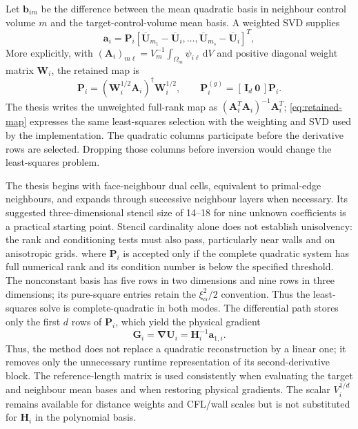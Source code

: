 \documentclass[11pt]{article}
\newcommand{\U}{\bm{U}}
\newcommand{\grad}{\bm{\nabla}}
\newcommand{\dd}{\mathrm{d}}
\begin{document}
Let $\bm b_{im}$ be the difference between the mean quadratic basis in neighbour control volume $m$ and the target-control-volume mean basis.  A weighted SVD supplies
\begin{equation}
 \bm a_i=\bm P_i
 \left[
  \overline{\U}_{m_1}-\overline{\U}_{i},\ldots,
  \overline{\U}_{m_s}-\overline{\U}_{i}
 \right]^{T},
\label{eq:quadratic-svd}
\end{equation}
More explicitly, with $(\bm A_i)_{m\ell}=V_m^{-1}\int_{\Omega_m}\psi_{i\ell}\,\dd V$ and positive diagonal weight matrix $\bm W_i$, the retained map is
\begin{equation}
 \bm P_i=(\bm W_i^{1/2}\bm A_i)^\dagger\bm W_i^{1/2},
 \qquad
 \bm P_i^{(g)}=[\,\bm I_d\ \bm 0\,]\bm P_i.
 \label{eq:retained-map}
\end{equation}
The thesis writes the unweighted full-rank map as $(\bm A_i^T\bm A_i)^{-1}\bm A_i^T$; \eqref{eq:retained-map} expresses the same least-squares selection with the weighting and SVD used by the implementation.  The quadratic columns participate before the derivative rows are selected.  Dropping those columns before inversion would change the least-squares problem.

The thesis begins with face-neighbour dual cells, equivalent to primal-edge neighbours, and expands through successive neighbour layers when necessary.  Its suggested three-dimensional stencil size of 14--18 for nine unknown coefficients is a practical starting point.  Stencil cardinality alone does not establish unisolvency: the rank and conditioning tests must also pass, particularly near walls and on anisotropic grids.
where $\bm P_i$ is accepted only if the complete quadratic system has full numerical rank and its condition number is below the specified threshold.  The nonconstant basis has five rows in two dimensions and nine rows in three dimensions; its pure-square entries retain the $\xi_\alpha^2/2$ convention.  Thus the least-squares solve is complete-quadratic in both modes.  The differential path stores only the first $d$ rows of $\bm P_i$, which yield the physical gradient
\begin{equation}
 \bm G_i=\grad\U_i=\bm H_i^{-1}\bm a_{1,i}.
 \label{eq:gradient}
\end{equation}
Thus, the method does not replace a quadratic reconstruction by a linear one; it removes only the unnecessary runtime representation of its second-derivative block.  The reference-length matrix is used consistently when evaluating the target and neighbour mean bases and when restoring physical gradients.  The scalar $V_i^{1/d}$ remains available for distance weights and CFL/wall scales but is not substituted for $\bm H_i$ in the polynomial basis.
\end{document}
